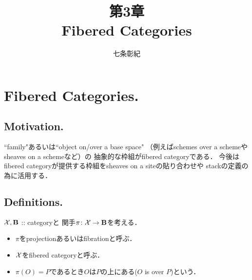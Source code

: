\documentclass[a4paper, dvipdfmx]{jsarticle}
\begin{document}
\title{第3章 \\ Fibered Categories}
\author{七条彰紀}
\maketitle
\tableofcontents
\vspace{10pt}

\section{Fibered Categories.}
\subsection{Motivation.}
    ``family"あるいは``object on/over a base space"
    （例えばschemes over a schemeやsheaves on a schemeなど）の
    抽象的な枠組がfibered categoryである．
    今後はfibered categoryが提供する枠組をsheaves on a siteの貼り合わせや
    stackの定義の為に活用する．

\subsection{Definitions.}
    $\mathcal{X}, \mathbf{B}$ :: categoryと
    関手$\pi \colon \mathcal{X} \to \mathbf{B}$を考える．
    \begin{itemize}
    \item 
        $\pi$をprojectionあるいはfibrationと呼ぶ．
    \item
        $\mathcal{X}$をfibered categoryと呼ぶ．
    \item
        $\pi(O)=P$であるとき$O$は$P$の上にある($O$ is over $P$)という．
    \end{itemize}
\end{document}
